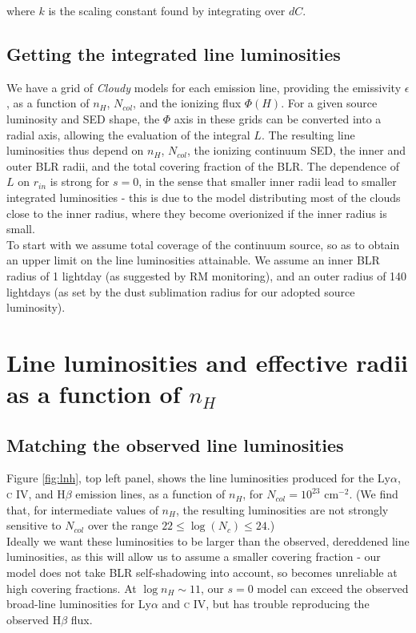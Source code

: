 \documentclass[paper=a4, fontsize=11pt]{scrartcl} %
\numberwithin{equation}{section} %
\numberwithin{figure}{section} %
\numberwithin{table}{section} %
\begin{document}
where $k$ is the scaling constant found by integrating over $dC$.\\

\subsection{Getting the integrated line luminosities}

We have a grid of \emph{Cloudy} models for each emission line, providing the emissivity $\epsilon$, as a function of $n_H$, $N_{col}$, and the ionizing flux $\Phi(H)$. For a given source luminosity and SED shape, the $\Phi$ axis in these grids can be converted into a radial axis, allowing the evaluation of the integral $L$. The resulting line luminosities thus depend on $n_H$, $N_{col}$, the ionizing continuum SED, the inner and outer BLR radii, and the total covering fraction of the BLR. The dependence of $L$ on $r_{in}$ is strong for $s=0$, in the sense that smaller inner radii lead to smaller integrated luminosities - this is due to the model distributing most of the clouds close to the inner radius, where they become overionized if the inner radius is small.\\

To start with we assume total coverage of the continuum source, so as to obtain an upper limit on the line luminosities attainable. We assume an inner BLR radius of 1 lightday (as suggested by RM monitoring), and an outer radius of 140 lightdays (as set by the dust sublimation radius for our adopted source luminosity).

\section{Line luminosities and effective radii as a function of $n_H$}

\subsection{Matching the observed line luminosities}

Figure \ref{fig:lnh}, top left panel, shows the line luminosities produced for the Ly$\alpha$, \textsc{c IV}, and H$\beta$ emission lines, as a function of $n_H$, for $N_{col}=10^{23}$ cm$^{-2}$. (We find that, for intermediate values of $n_H$, the resulting luminosities are not strongly sensitive to $N_{col}$ over the range $22\le\log(N_c)\le24$.)\\ 

Ideally we want these luminosities to be larger than the observed, dereddened line luminosities, as this will allow us to assume a smaller covering fraction - our model does not take BLR self-shadowing into account, so becomes unreliable at high covering fractions. At $\log n_H\sim11$, our $s=0$ model can exceed the observed broad-line luminosities for Ly$\alpha$ and \textsc{c IV}, but has trouble reproducing the observed H$\beta$ flux.
\end{document}
